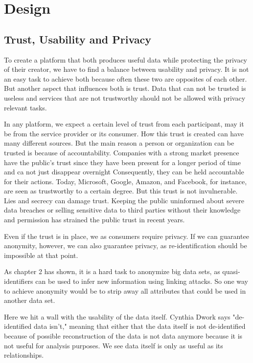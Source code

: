 
\chapter{Design}\label{chapter:design}
\section{Trust, Usability and Privacy}
To create a platform that both produces useful data while protecting the privacy of their creator, we have to find a balance between usability and privacy. It is not an easy task to achieve both because often these two are opposites of each other. But another aspect that influences both is trust. Data that can not be trusted is useless and services that are not trustworthy should not be allowed with privacy relevant tasks.
 
In any platform, we expect a certain level of trust from each participant, may it be from the service provider or its consumer. How this trust is created can have many different sources. But the main reason a person or organization can be trusted is because of accountability. Companies with a strong market presence have the public's trust since they have been present for a longer period of time and ca not just disappear overnight
 Consequently, they can be held accountable for their actions. Today, Microsoft, Google, Amazon, and Facebook, for instance, are seen as trustworthy to a certain degree. But this trust is not invulnerable. Lies and secrecy can damage trust. Keeping the public uninformed about severe data breaches or selling sensitive data to third parties without their knowledge and permission has strained the public trust in recent years.

Even if the trust is in place, we as consumers require privacy. If we can guarantee anonymity, however, we can also guarantee privacy, as re-identification should be impossible at that point.

As chapter 2 has shown, it is a hard task to anonymize big data sets, as quasi-identifiers can be used to infer new information using linking attacks. So one way to achieve anonymity would be to strip away all attributes that could be used in another data set.

Here we hit a wall with the usability of the data itself. Cynthia Dwork \cite{dwork} says "de-identified data isn't," meaning that either that the data itself is not de-identified because of possible reconstruction of the data is not data anymore because it is not useful for analysis purposes. We see data itself is only as useful as its relationships.

